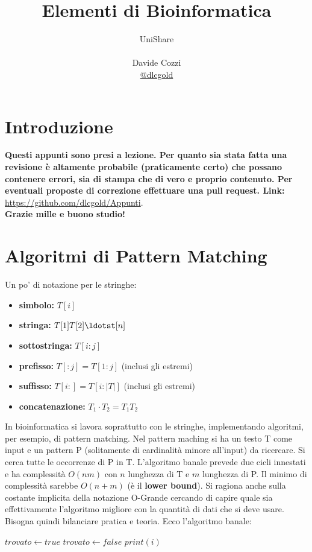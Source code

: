 \documentclass[a4paper,12pt, oneside]{book}
\title{Elementi di Bioinformatica}
\author{UniShare\\\\Davide Cozzi\\\href{https://t.me/dlcgold}{@dlcgold}}
\date{}
\begin{document}
\maketitle

\newtheorem{teorema}{Teorema}
\newtheorem{definizione}{Definizione}
\newtheorem{esempio}{Esempio}
\newtheorem{corollario}{Corollario}
\newtheorem{lemma}{Lemma}
\newtheorem{osservazione}{Osservazione}
\newtheorem{nota}{Nota}
\newtheorem{esercizio}{Esercizio}
\tableofcontents
\renewcommand{\chaptermark}[1]{%
  \markboth{\chaptername
    \ \thechapter.\ #1}{}}
\renewcommand{\sectionmark}[1]{\markright{\thesection.\ #1}}
\chapter{Introduzione}
\textbf{Questi appunti sono presi a lezione. Per quanto sia stata
  fatta una revisione è altamente probabile (praticamente certo) che
  possano contenere errori, sia di stampa che di vero e proprio
  contenuto. Per eventuali proposte di correzione effettuare
  una pull request. Link: }
\url{https://github.com/dlcgold/Appunti}.\\
\textbf{Grazie mille e buono studio!}
\chapter{Algoritmi di Pattern Matching}
Un po' di notazione per le stringhe:
\begin{itemize}
  \item \textbf{simbolo:} $T[i]$
  \item \textbf{stringa:} $T[1]T[2]\ldotst[n]$
  \item \textbf{sottostringa:} $T[i:j]$
  \item \textbf{prefisso:} $T[:j] = T[1:j]$ (inclusi gli estremi)
  \item \textbf{suffisso:} $T[i:] = T[i:|T|]$ (inclusi gli estremi)
  \item \textbf{concatenazione:} $T_1\cdot T_2 = T_1T_2$
\end{itemize}
In bioinformatica si lavora soprattutto con le stringhe, implementando
algoritmi, per esempio, di pattern matching. Nel pattern maching si ha
un testo T come input e un pattern P (solitamente di cardinalità minore
all'input) da ricercare. Si cerca tutte le occorrenze di P in
T. L'algoritmo banale prevede due cicli innestati e ha complessità
$O(nm)$ con $n$ lunghezza di T e $m$ lunghezza di P. Il minimo di
complessità sarebbe $O(n+m)$ (è il \textbf{lower bound}). Si ragiona
anche sulla costante implicita della notazione O-Grande cercando di
capire quale sia effettivamente l'algoritmo migliore con la quantità
di dati che si deve usare. Bisogna quindi bilanciare pratica e teoria.
\newpage
Ecco l'algoritmo banale:
\begin{shaded}
  \begin{algorithmic}
    \State $trovato \gets true$
    \State $trovato \gets false$
    \EndIf
    \EndFor
    \State $print(i)$
    \EndIf
    \EndFor
  \end{algorithmic} 
\end{shaded}
\end{document}
